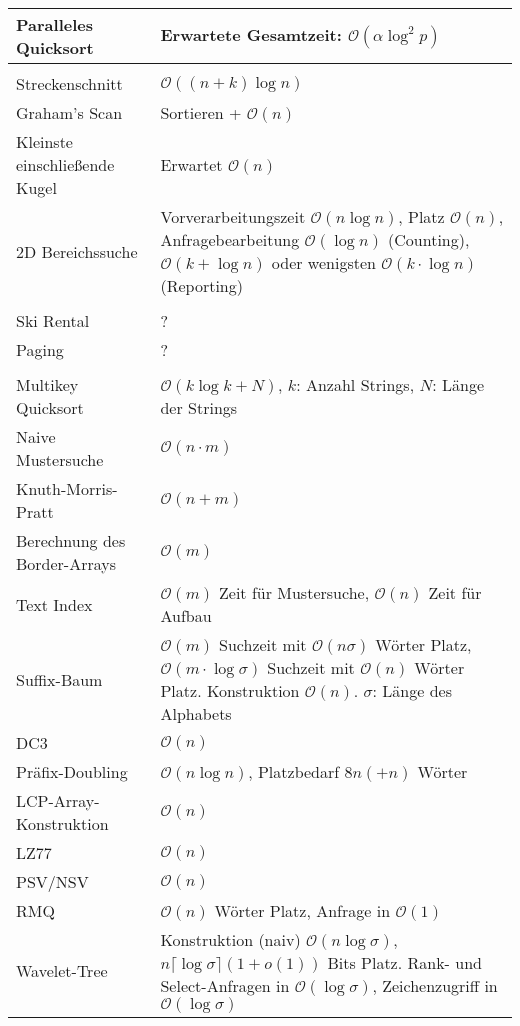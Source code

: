 \documentclass[11pt]{scrartcl}
\begin{document}
\begin{xltabular}{\linewidth}{p{60mm}p{80mm}}
    Paralleles Quicksort &
    Erwartete Gesamtzeit: $\mathcal{O}(\alpha \log^2 p)$ \\
    \hline
    \vspace{-1em} & \\ 
    \hline
    Streckenschnitt &
    $\mathcal{O}((n + k) \log n)$ \\
    \hline
    Graham's Scan &
    Sortieren + $\mathcal{O}(n)$ \\
    \hline
    Kleinste einschließende Kugel &
    Erwartet $\mathcal{O}(n)$ \\
    \hline
    2D Bereichssuche &
    Vorverarbeitungszeit $\mathcal{O}(n \log n)$, Platz $\mathcal{O}(n)$, Anfragebearbeitung
    $\mathcal{O}(\log n)$ (Counting), $\mathcal{O}(k + \log n)$ oder wenigsten $\mathcal{O}(k 
    \cdot \log n)$ (Reporting) \\
    \hline
    \vspace{-1em} & \\ 
    \hline
    Ski Rental &
    ? \\
    \hline
    Paging &
    ? \\
    \hline
    \vspace{-1em} & \\ 
    \hline
    Multikey Quicksort &
    $\mathcal{O}(k \log k + N)$, $k$: Anzahl Strings, $N$: Länge der Strings\\
    \hline
    Naive Mustersuche &
    $\mathcal{O}(n \cdot m)$ \\ 
    \hline
    Knuth-Morris-Pratt &
    $\mathcal{O}(n + m)$ \\
    \hline
    Berechnung des Border-Arrays &
    $\mathcal{O}(m)$ \\
    \hline
    Text Index &
    $\mathcal{O}(m)$ Zeit für Mustersuche, $\mathcal{O}(n)$ Zeit für Aufbau \\
    \hline
    Suffix-Baum &
    $\mathcal{O}(m)$ Suchzeit mit $\mathcal{O}(n \sigma)$ Wörter Platz, $\mathcal{O}(m \cdot 
    \log \sigma)$ Suchzeit mit $\mathcal{O}(n)$ Wörter Platz. Konstruktion $\mathcal{O}(n)$.
    $\sigma$: Länge des Alphabets \\
    \hline
    DC3 &
    $\mathcal{O}(n)$ \\
    \hline
    Präfix-Doubling &
    $\mathcal{O}(n \log n)$, Platzbedarf $8n (+ n)$ Wörter \\
    \hline
    LCP-Array-Konstruktion &
    $\mathcal{O}(n)$ \\
    \hline
    LZ77 &
    $\mathcal{O}(n)$ \\
    \hline
    PSV/NSV &
    $\mathcal{O}(n)$ \\
    \hline
    RMQ &
    $\mathcal{O}(n)$ Wörter Platz, Anfrage in $\mathcal{O}(1)$ \\
    \hline
    Wavelet-Tree &
    Konstruktion (naiv) $\mathcal{O}(n \log \sigma)$, $n \lceil \log \sigma \rceil (1 + o(1))$ 
    Bits Platz. Rank- und Select-Anfragen in $\mathcal{O}(\log \sigma)$, Zeichenzugriff in 
    $\mathcal{O}(\log \sigma)$ \\
\end{xltabular}
\end{document}
